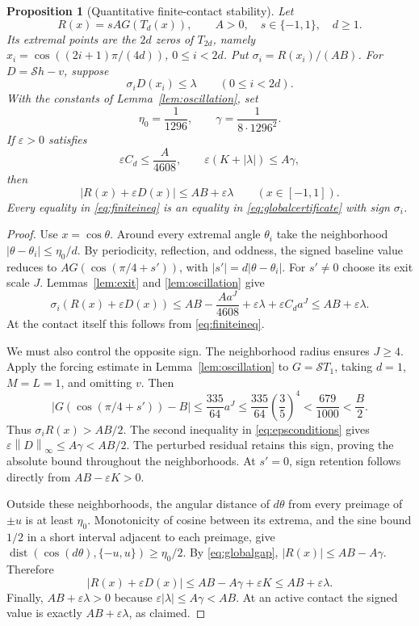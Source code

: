 \documentclass[11pt]{article}
\newtheorem{proposition}[theorem]{Proposition}
\theoremstyle{remark}\newtheorem{remark}[theorem]{Remark}
\newcommand{\norm}[1]{\left\|#1\right\|_\infty}
\newcommand{\eps}{\varepsilon}
\newcommand{\dist}{\operatorname{dist}}
\begin{document}
\begin{proposition}[Quantitative finite-contact stability]\label{prop:stability}
Let
\[
 R(x)=sA G(T_d(x)),\qquad A>0,\quad s\in\{-1,1\},\quad d\ge1.
\]
Its extremal points are the $2d$ zeros of $T_{2d}$, namely
$x_i=\cos((2i+1)\pi/(4d))$, $0\le i<2d$. Put
$\sigma_i=R(x_i)/(AB)$. For $D=\mathcal S h-v$, suppose
\begin{equation}\label{eq:finiteineq}
 \sigma_iD(x_i)\le\lambda\qquad(0\le i<2d).
\end{equation}
With the constants of Lemma~\ref{lem:oscillation}, set
\[
 \eta_0=\frac1{1296},\qquad
 \gamma=\frac1{8\cdot1296^2}.
\]
If $\eps>0$ satisfies
\begin{equation}\label{eq:epsconditions}
 \eps C_d\le\frac{A}{4608},\qquad
 \eps(K+|\lambda|)\le A\gamma,
\end{equation}
then
\begin{equation}\label{eq:globalcertificate}
 |R(x)+\eps D(x)|\le AB+\eps\lambda\qquad(x\in[-1,1]).
\end{equation}
Every equality in \eqref{eq:finiteineq} is an equality in
\eqref{eq:globalcertificate} with sign $\sigma_i$.
\end{proposition}
\begin{proof}
Use $x=\cos\theta$. Around every extremal angle $\theta_i$ take the
neighborhood $|\theta-\theta_i|\le\eta_0/d$. By periodicity, reflection,
and oddness, the signed baseline value reduces to
$AG(\cos(\pi/4+s'))$, with $|s'|=d|\theta-\theta_i|$.
For $s'\ne0$ choose its exit scale $J$. Lemmas~\ref{lem:exit} and
\ref{lem:oscillation} give
\[
 \sigma_i(R(x)+\eps D(x))
 \le AB-\frac{A a^J}{4608}+\eps\lambda+\eps C_d a^J
 \le AB+\eps\lambda.
\]
At the contact itself this follows from \eqref{eq:finiteineq}.

We must also control the opposite sign. The neighborhood radius ensures
$J\ge4$. Apply the forcing estimate in Lemma~\ref{lem:oscillation} to
$G=\mathcal S T_1$, taking $d=1$, $M=L=1$, and omitting $v$. Then
\[
 |G(\cos(\pi/4+s'))-B|
 \le\frac{335}{64}a^J
 \le\frac{335}{64}\left(\frac35\right)^4
 <\frac{679}{1000}<\frac B2.
\]
Thus $\sigma_iR(x)>AB/2$. The second inequality in
\eqref{eq:epsconditions} gives $\eps\norm D\le A\gamma<AB/2$.
The perturbed residual retains this sign, proving the absolute bound
throughout the neighborhoods. At $s'=0$, sign retention follows directly
from $AB-\eps K>0$.

Outside these neighborhoods, the angular distance of $d\theta$ from
every preimage of $\pm u$ is at least $\eta_0$. Monotonicity of cosine
between its extrema, and the sine bound $1/2$ in a short interval adjacent
to each preimage, give
$\dist(\cos(d\theta),\{-u,u\})\ge\eta_0/2$.
By \eqref{eq:globalgap}, $|R(x)|\le AB-A\gamma$. Therefore
\[
 |R(x)+\eps D(x)|\le AB-A\gamma+\eps K\le AB+\eps\lambda.
\]
Finally, $AB+\eps\lambda>0$ because
$\eps|\lambda|\le A\gamma<AB$. At an active contact the signed value
is exactly $AB+\eps\lambda$, as claimed.
\end{proof}
\end{document}
